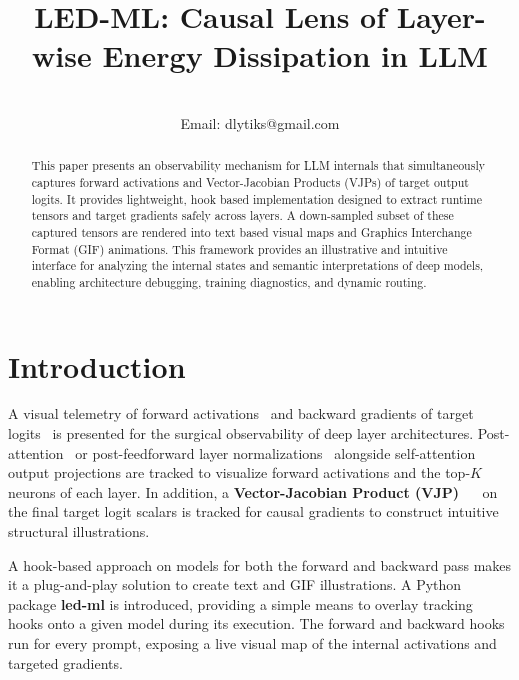 \documentclass[10pt,conference]{IEEEtran}
\begin{document}
\title{LED-ML: Causal Lens of Layer-wise Energy Dissipation in LLM}

\author{
\\
Email: dlytiks@gmail.com
}
\maketitle

\begin{abstract}
This paper presents an observability mechanism for LLM internals that simultaneously captures forward activations and Vector-Jacobian Products (VJPs) of target output logits. It provides lightweight, hook based implementation designed to extract runtime tensors and target gradients safely across layers. A down-sampled subset of these captured tensors are rendered into text based visual maps and Graphics Interchange Format (GIF) animations. This framework provides an illustrative and intuitive interface for analyzing the internal states and semantic interpretations of deep models, enabling architecture debugging, training diagnostics, and dynamic routing.
\end{abstract}

\section{Introduction}

A visual telemetry of forward activations~\cite{paszke2019pytorch} and backward gradients of target logits~\cite{mu_mis2026remaining} is presented for the surgical observability of deep layer architectures. Post-attention~\cite{postln2026back} or post-feedforward layer normalizations~\cite{dead2026directions} alongside self-attention output projections are tracked to visualize forward activations and the top-$K$ neurons of each layer. In addition, a \textbf{Vector-Jacobian Product (VJP)}~\cite{goodfellow2016deep} ~\cite{bakong2026unbiased}  on the final target logit scalars is tracked for causal gradients to construct intuitive structural illustrations.

A hook-based approach on models for both the forward and backward pass makes it a plug-and-play solution to create text and GIF illustrations. A Python package \textbf{led-ml} is introduced, providing a simple means to overlay tracking hooks onto a given model during its execution. The forward and backward hooks run for every prompt, exposing a live visual map of the internal activations and targeted gradients.
\end{document}
